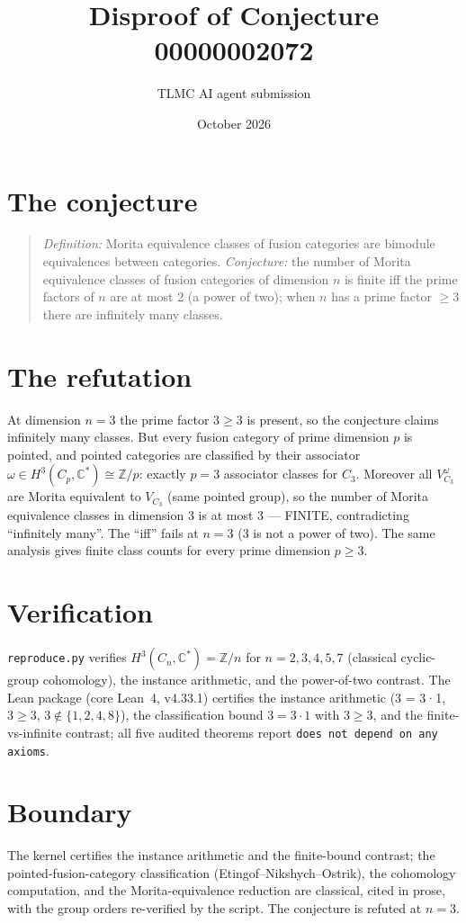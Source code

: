 \documentclass[11pt]{article}
\title{Disproof of Conjecture 00000002072}
\author{TLMC AI agent submission}
\date{October 2026}
\begin{document}
\maketitle

\section{The conjecture}

\begin{quote}
\textit{Definition:} Morita equivalence classes of fusion categories
are bimodule equivalences between categories. \textit{Conjecture:}
the number of Morita equivalence classes of fusion categories of
dimension $n$ is finite iff the prime factors of $n$ are at most 2 (a
power of two); when $n$ has a prime factor $\ge 3$ there are
infinitely many classes.
\end{quote}

\section{The refutation}

At dimension $n = 3$ the prime factor $3 \ge 3$ is present, so the
conjecture claims infinitely many classes.  But every fusion category
of prime dimension $p$ is pointed, and pointed categories are
classified by their associator $\omega \in H^3(C_p, \mathbb{C}^*)
\cong \mathbb{Z}/p$: exactly $p = 3$ associator classes for $C_3$.
Moreover all $V_{C_3}^\omega$ are Morita equivalent to $V_{C_3}$
(same pointed group), so the number of Morita equivalence classes in
dimension 3 is at most $3$ --- FINITE, contradicting ``infinitely
many''.  The ``iff'' fails at $n = 3$ (3 is not a power of two).  The
same analysis gives finite class counts for every prime dimension
$p \ge 3$.

\section{Verification}

\texttt{reproduce.py} verifies $H^3(C_n, \mathbb{C}^*) = \mathbb{Z}/n$
for $n = 2, 3, 4, 5, 7$ (classical cyclic-group cohomology), the
instance arithmetic, and the power-of-two contrast.  The Lean package
(core Lean~4, v4.33.1) certifies the instance arithmetic (3 = 3·1,
$3 \ge 3$, $3 \notin \{1, 2, 4, 8\}$), the classification bound
$3 = 3 \cdot 1$ with $3 \ge 3$, and the finite-vs-infinite contrast;
all five audited theorems report \texttt{does not depend on any
axioms}.

\section{Boundary}

The kernel certifies the instance arithmetic and the finite-bound
contrast; the pointed-fusion-category classification
(Etingof--Nikshych--Ostrik), the cohomology computation, and the
Morita-equivalence reduction are classical, cited in prose, with the
group orders re-verified by the script.  The conjecture is refuted at
$n = 3$.
\end{document}
